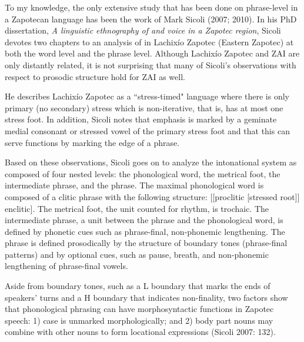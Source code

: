 To my knowledge, the only extensive study that has been done on phrase-level  in a Zapotecan language has been the work of Mark Sicoli (2007; 2010). In his PhD dissertation, \textit{A linguistic ethnography of  and voice in a Zapotec region}, Sicoli devotes two chapters to an analysis of  in Lachix\'{i}o Zapotec (Eastern Zapotec) at both the word level and the phrase level. Although Lachix\'{i}o Zapotec and ZAI are only distantly related, it is not surprising that many of Sicoli's observations with respect to prosodic structure hold for ZAI as well. 

He describes Lachix\'{i}o Zapotec as a ``stress-timed" language where there is only primary (no secondary) stress which is non-iterative, that is, has at most one stress foot. In addition, Sicoli notes that emphasis is marked by a geminate medial consonant or stressed vowel of the primary stress foot and that this can serve  functions by marking the edge of a phrase. 

Based on these observations, Sicoli goes on to analyze the intonational system as composed of four nested levels: the phonological word, the metrical foot, the intermediate phrase, and the  phrase. The maximal phonological word is composed of a clitic phrase with the following structure: [[proclitic [stressed root]] enclitic]. The metrical foot, the unit counted for rhythm, is trochaic. The intermediate phrase, a unit between the  phrase and the phonological word, is defined by phonetic cues such as phrase-final, non-phonemic lengthening. The  phrase is defined prosodically by the structure of boundary tones (phrase-final  patterns) and by optional cues, such as pause, breath, and non-phonemic lengthening of phrase-final vowels. 

Aside from boundary tones, such as a L boundary  that marks the ends of speakers' turns and a H boundary  that indicates non-finality, two factors show that phonological phrasing can have morphosyntactic functions in Zapotec speech: 1) case is unmarked morphologically; and 2) body part nouns may combine with other nouns to form locational expressions (Sicoli 2007: 132).

